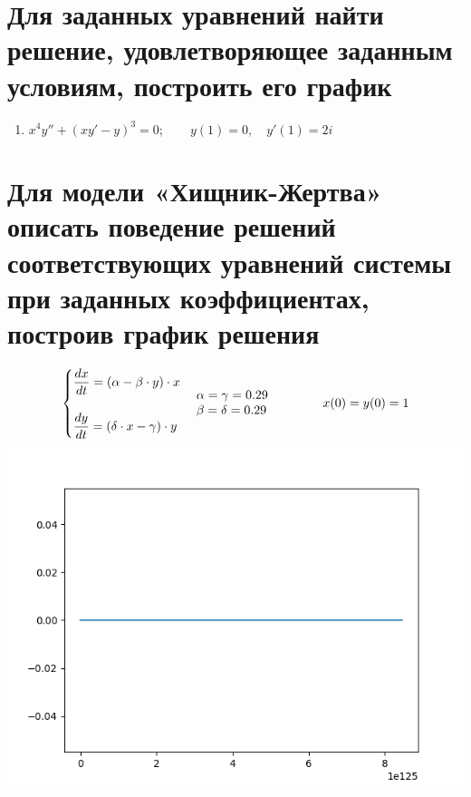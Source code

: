 \documentclass[14pt, a4paper]{extarticle}
\begin{document}
	\section{Для заданных уравнений найти решение, удовлетворяющее заданным условиям, построить его график}
		\begin{enumerate}
			\item \(x^4 y'' + \left(xy' - y\right)^3 = 0; \qquad y(1) = 0, \quad y'(1) = 2i\)
		\end{enumerate}
		\pagebreak
		
	\section{Для модели «Хищник-Жертва» описать поведение решений соответствующих уравнений системы при заданных коэффициентах, построив график решения}
		\begin{align*}
			\begin{cases}
				\dfrac{dx}{dt} = \left(\alpha - \beta \cdot y\right) \cdot x \\ \\				
				\dfrac{dy}{dt} = \left(\delta \cdot x - \gamma \right) \cdot y
			\end{cases}
			\parbox{100pt}{\(\alpha = \gamma = 0.29\)  \\ \(\beta = \delta = 0.29\)}
			x(0) = y(0) = 1
		\end{align*}
		\hspace{1cm}\includegraphics[width=15cm]{plot}
		\pagebreak
		
\end{document}
